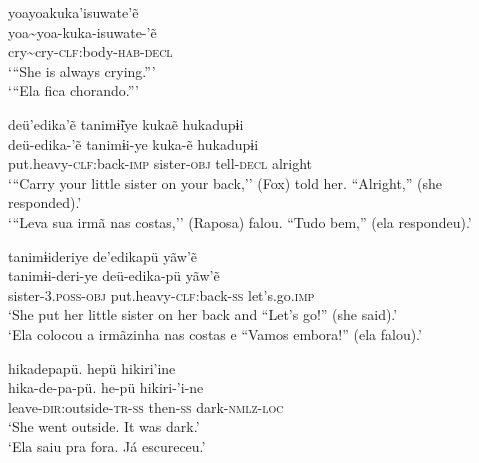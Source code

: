 \documentclass[output=paper,
modfonts,nonflat
]{langsci/langscibook}
\begin{document}

\ea   yoayoakuka'isuwate'ẽ \\[.3em]
\gll  yoa\textasciitilde yoa-kuka-isuwate-'ẽ \\
cry\textasciitilde cry-\textsc{clf:}body-\textsc{hab-decl}\\
\glt  `{``}She is always crying.{''}' \\
`{``}Ela fica chorando.{''}'\\
\z

\ea   deü'edika'ẽ tanimɨ̃iye kukaẽ hukadupɨi \\[.3em]
\gll  deü-edika-'ẽ tanimɨi-ye kuka-ẽ hukadupɨi\\
put.heavy-\textsc{clf:}back-\textsc{imp} sister-\textsc{obj} tell-\textsc{decl} alright\\
\glt   `{``}Carry your little sister on your back,'' (Fox) told her. ``Alright,'' (she responded).'\\
`{``}Leva sua irmã nas costas,'' (Raposa) falou. ``Tudo bem,'' (ela respondeu).'\\

\z

\ea   tanimɨideriye de'edikapü yãw'ẽ \\[.3em]
\gll  tanimɨi-deri-ye deü-edika-pü yãw'ẽ \\
sister-\textsc{3.poss-obj} put.heavy-\textsc{clf:}back-\textsc{ss} let's.go.\textsc{imp}\\
\glt  `She put her little sister on her back and ``Let's go!{''} (she said).' \\
`Ela colocou a irmãzinha nas costas e ``Vamos embora!{''} (ela falou).' \\
\z

\ea  hikadepapü.  hepü hikiri'ine \\[.3em]
\gll hika-de-pa-pü.  he-pü hikiri-'i-ne\\
leave-\textsc{dir:}outside-\textsc{tr-ss} then-\textsc{ss} dark-\textsc{nmlz-loc} \\
\glt   `She went outside. It was dark.'\\
`Ela saiu pra fora. Já escureceu.'\\
 \z       
\end{document}
